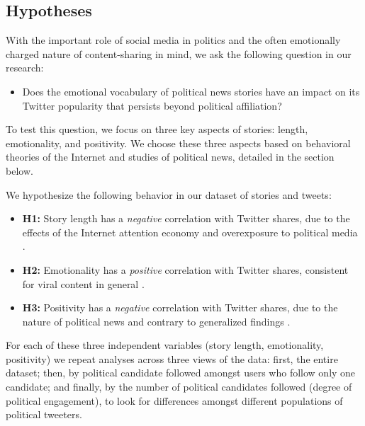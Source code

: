 \documentclass[letterpaper]{article}
\begin{document}
 

 \subsection{Hypotheses}
With the important role of social media in politics and the often emotionally charged nature of content-sharing in mind, we ask the following question in our research: 

\begin{itemize}
\item Does the emotional vocabulary of political news stories have an impact on its Twitter popularity that persists beyond political affiliation?  
\end{itemize}

To test this question, we focus on three key aspects of stories: length, emotionality, and positivity. We choose these three aspects based on behavioral theories of the Internet and studies of political news, detailed in the section below.  

We hypothesize the following behavior in our dataset of stories and tweets:

\begin{itemize} 
    \item \textbf{H1:} Story length has a \emph{negative} correlation with Twitter shares, due to the effects of the Internet attention economy and overexposure to political media \cite{goldhaber1997attention}.
    \item \textbf{H2:} Emotionality has a \emph{positive} correlation with Twitter shares, consistent for viral content in general \cite{berger2012makes}.
    \item \textbf{H3:} Positivity has a \emph{negative} correlation with Twitter shares, due to the nature of political news and contrary to generalized findings \cite{berger2012makes}.

\end{itemize}

For each of these three independent variables (story length, emotionality, positivity) we repeat analyses across three views of the data: first, the entire dataset; then, by political candidate followed amongst users who follow only one candidate; and finally, by the number of political candidates followed (degree of political engagement), to look for differences amongst different populations of political tweeters.
\end{document}
